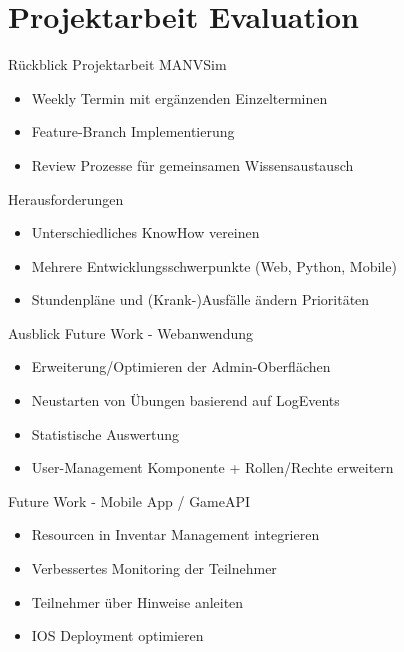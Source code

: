 \section{Projektarbeit Evaluation}

\begin{frame}{Rückblick}
	Projektarbeit MANVSim 
	\begin{itemize}
		\item Weekly Termin mit ergänzenden Einzelterminen
		\item Feature-Branch Implementierung
		\item Review Prozesse für gemeinsamen Wissensaustausch
	\end{itemize}
    Herausforderungen
	\begin{itemize}
		\item Unterschiedliches KnowHow vereinen
		\item Mehrere Entwicklungsschwerpunkte (Web, Python, Mobile)
		\item Stundenpläne und (Krank-)Ausfälle ändern Prioritäten
	\end{itemize}
\end{frame}
\begin{frame}{Ausblick}
	Future Work - Webanwendung
	\begin{itemize}
		\item Erweiterung/Optimieren der Admin-Oberflächen
		\item Neustarten von Übungen basierend auf LogEvents
		\item Statistische Auswertung
		\item User-Management Komponente + Rollen/Rechte erweitern 	
	\end{itemize}

    Future Work - Mobile App / GameAPI
	\begin{itemize}
		\item Resourcen in Inventar Management integrieren
		\item Verbessertes Monitoring der Teilnehmer
		\item Teilnehmer über Hinweise anleiten
		\item IOS Deployment optimieren
	\end{itemize}
\end{frame}